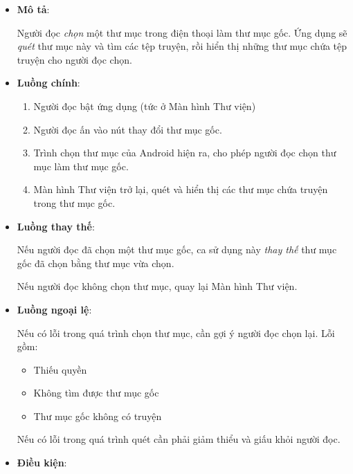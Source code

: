 \begin{itemize}
  \item
        \textbf{Mô tả}:

        Người đọc \emph{chọn} một thư mục trong điện thoại làm thư mục gốc.
        Ứng dụng sẽ \emph{quét} thư mục này và tìm các tệp truyện, rồi hiển
        thị những thư mục chứa tệp truyện cho người đọc chọn.
  \item
        \textbf{Luồng chính}:

        \begin{enumerate}
          \def\labelenumi{\arabic{enumi}.}
          
          \item
                Người đọc bật ứng dụng (tức ở Màn hình Thư viện)
          \item
                Người đọc ấn vào nút thay đổi thư mục gốc.
          \item
                Trình chọn thư mục của Android hiện ra, cho phép người đọc chọn thư
                mục làm thư mục gốc.
          \item
                Màn hình Thư viện trở lại, quét và hiển thị các thư mục chứa truyện
                trong thư mục gốc.
        \end{enumerate}
  \item
        \textbf{Luồng thay thế}:

        Nếu người đọc đã chọn một thư mục gốc, ca sử dụng này \emph{thay thế}
        thư mục gốc đã chọn bằng thư mục vừa chọn.

        Nếu người đọc không chọn thư mục, quay lại Màn hình Thư viện.
  \item
        \textbf{Luồng ngoại lệ}:

        Nếu có lỗi trong quá trình chọn thư mục, cần gợi ý người đọc chọn lại.
        Lỗi gồm:

        \begin{itemize}
          
          \item
                Thiếu quyền
          \item
                Không tìm được thư mục gốc
          \item
                Thư mục gốc không có truyện
        \end{itemize}

        Nếu có lỗi trong quá trình quét cần phải giảm thiểu và giấu khỏi người
        đọc.
  \item
        \textbf{Điều kiện}:


\end{itemize}
